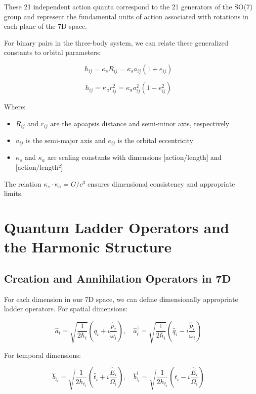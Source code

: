 \documentclass{article}
\begin{document}
These 21 independent action quanta correspond to the 21 generators of the SO(7) group and represent the fundamental units of action associated with rotations in each plane of the 7D space.

For binary pairs in the three-body system, we can relate these generalized constants to orbital parameters:

\begin{equation}
\hbar_{ij} = \kappa_s R_{ij} = \kappa_s a_{ij}(1+e_{ij})
\end{equation}

\begin{equation}
h_{ij} = \kappa_a r_{ij}^2 = \kappa_a a_{ij}^2(1-e_{ij}^2)
\end{equation}

Where:
\begin{itemize}
\item $R_{ij}$ and $r_{ij}$ are the apoapsis distance and semi-minor axis, respectively
\item $a_{ij}$ is the semi-major axis and $e_{ij}$ is the orbital eccentricity
\item $\kappa_s$ and $\kappa_a$ are scaling constants with dimensions [action/length] and [action/length²]
\end{itemize}

The relation $\kappa_s \cdot \kappa_a = G/c^3$ ensures dimensional consistency and appropriate limits.

\section{Quantum Ladder Operators and the Harmonic Structure}

\subsection{Creation and Annihilation Operators in 7D}

For each dimension in our 7D space, we can define dimensionally appropriate ladder operators. For spatial dimensions:

\begin{equation}
\hat{a}_i = \sqrt{\frac{1}{2\hbar_i}}(\hat{q}_i + i\frac{\hat{p}_i}{\omega_i}), \quad \hat{a}_i^\dagger = \sqrt{\frac{1}{2\hbar_i}}(\hat{q}_i - i\frac{\hat{p}_i}{\omega_i})
\end{equation}

For temporal dimensions:

\begin{equation}
\hat{b}_{t_i} = \sqrt{\frac{1}{2h_{t_i}}}(\hat{t}_i + i\frac{\hat{E}_i}{\Omega_i}), \quad \hat{b}_{t_i}^\dagger = \sqrt{\frac{1}{2h_{t_i}}}(\hat{t}_i - i\frac{\hat{E}_i}{\Omega_i})
\end{equation}
\end{document}
